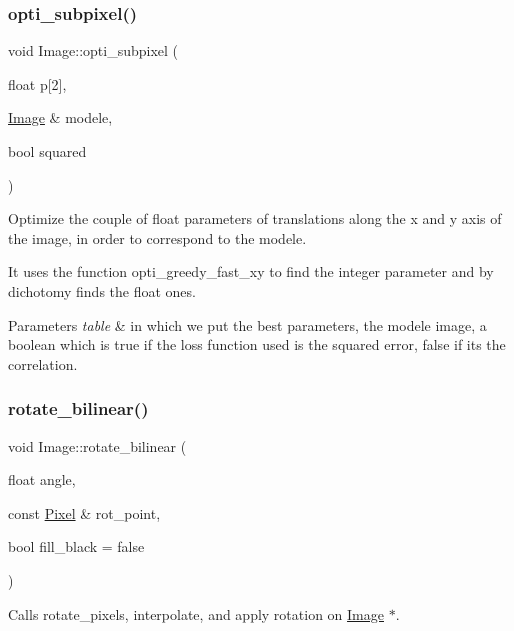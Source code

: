 \subsubsection{\texorpdfstring{opti\+\_\+subpixel()}{opti\_subpixel()}}
{\footnotesize\ttfamily void Image\+::opti\+\_\+subpixel (\begin{DoxyParamCaption}\item[{float}]{p\mbox{[}2\mbox{]},  }\item[{\hyperlink{class_image}{Image} \&}]{modele,  }\item[{bool}]{squared }\end{DoxyParamCaption})}



Optimize the couple of float parameters of translations along the x and y axis of the image, in order to correspond to the modele. 

It uses the function opti\+\_\+greedy\+\_\+fast\+\_\+xy to find the integer parameter and by dichotomy finds the float ones.


\begin{DoxyParams}{Parameters}
{\em table} & in which we put the best parameters, the modele image, a boolean which is true if the loss function used is the squared error, false if it\textquotesingle{}s the correlation. \\
\hline
\end{DoxyParams}
\mbox{\label{class_image_a64afdd661bf40ac0129227f8bf1daad1}} 
\subsubsection{\texorpdfstring{rotate\+\_\+bilinear()}{rotate\_bilinear()}}
{\footnotesize\ttfamily void Image\+::rotate\+\_\+bilinear (\begin{DoxyParamCaption}\item[{float}]{angle,  }\item[{const \hyperlink{class_pixel}{Pixel} \&}]{rot\+\_\+point,  }\item[{bool}]{fill\+\_\+black = {\ttfamily false} }\end{DoxyParamCaption})}



Calls rotate\+\_\+pixels, interpolate, and apply rotation on \hyperlink{class_image}{Image} $\ast$. 


